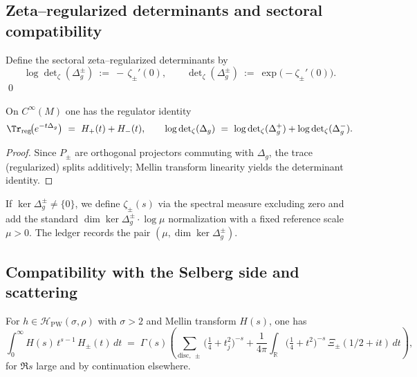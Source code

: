 \subsection{Zeta–regularized determinants and sectoral compatibility}
\label{subsec:ch6-part2-determinant} \relax \hspace{0pt}
\begin{definition}
\label{def:zeta-det}
Define the sectoral zeta–regularized determinants by
\[
\log\det\nolimits_\zeta(\Delta_g^\pm)\ :=\ -\,\zeta_\pm'(0),
\qquad
\det\nolimits_\zeta(\Delta_g^\pm)\ :=\ \exp\!\big(-\zeta_\pm'(0)\big).
\]
\qed
\end{definition}

\begin{proposition}
\label{prop:det-balance}
On $C^\infty(M)$ one has the regulator identity
\[
\Tr_{\mathrm{reg}}\!\big(e^{-t\Delta_g}\big)\ =\ H_+(t)+H_-(t),\qquad
\log\det\nolimits_\zeta(\Delta_g)\ =\ \log\det\nolimits_\zeta(\Delta_g^+)+\log\det\nolimits_\zeta(\Delta_g^-).
\]
\end{proposition}

\begin{proof}
Since $P_\pm$ are orthogonal projectors commuting with $\Delta_g$, the trace (regularized) splits additively; Mellin transform linearity yields the determinant identity. %
\end{proof}

\begin{remark}
\label{rem:zeromodes}
If $\ker\Delta_g^\pm\neq\{0\}$, we define $\zeta_\pm(s)$ via the spectral measure excluding zero and add the standard $\dim\ker\Delta_g^\pm\cdot \log \mu$ normalization with a fixed reference scale $\mu>0$. The ledger records the pair $(\mu,\dim\ker\Delta_g^\pm)$. %
\end{remark}


\subsection{Compatibility with the Selberg side and scattering}
\label{subsec:ch6-part2-selberg-compat} \relax \hspace{0pt}
\begin{lemma}
\label{lem:heat-selberg-bridge}
For $h\in\mathcal H_{\mathrm{PW}}(\sigma,\rho)$ with $\sigma>2$ and Mellin transform $H(s)$, one has
\[
\int_0^\infty H(s)\,t^{s-1}\,H_\pm(t)\,dt
\;=\;
\Gamma(s)\left(
\sum_{\mathrm{disc,\ \pm}} \big(\tfrac14+t_j^2\big)^{-s}
+\frac{1}{4\pi}\!\int_{\mathbb R} \big(\tfrac14+t^2\big)^{-s}\,\Xi_\pm(1/2+it)\,dt
\right),
\]
for $\Re s$ large and by continuation elsewhere. 
\end{lemma}

